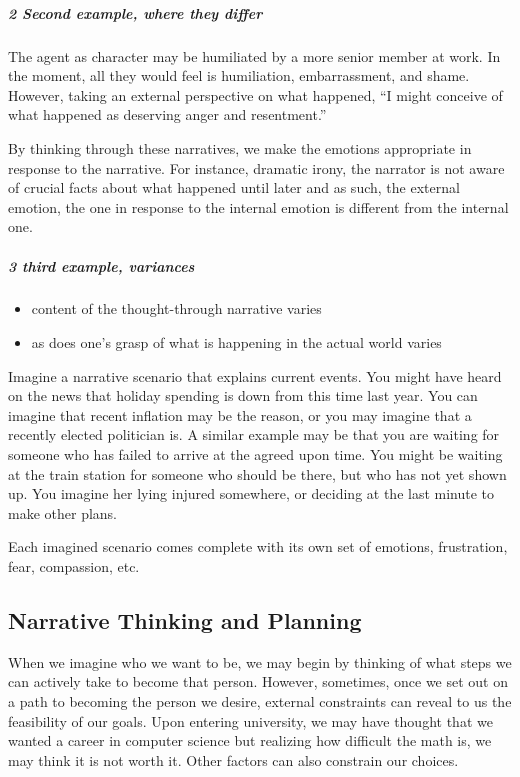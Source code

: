 \documentclass[
]{article}
\begin{document}
\hypertarget{second-example-where-they-differ}{%
\subparagraph{2 Second example, where they
differ}\label{second-example-where-they-differ}}

The agent as character may be humiliated by a more senior member at
work. In the moment, all they would feel is humiliation, embarrassment,
and shame. However, taking an external perspective on what happened, ``I
might conceive of what happened as deserving anger and resentment.''

By thinking through these narratives, we make the emotions appropriate
in response to the narrative. For instance, dramatic irony, the narrator
is not aware of crucial facts about what happened until later and as
such, the external emotion, the one in response to the internal emotion
is different from the internal one.

\hypertarget{third-example-variances}{%
\subparagraph{3 third example,
variances}\label{third-example-variances}}

\begin{itemize}
\item
  content of the thought-through narrative varies
\item
  as does one's grasp of what is happening in the actual world varies
\end{itemize}

Imagine a narrative scenario that explains current events. You might
have heard on the news that holiday spending is down from this time last
year. You can imagine that recent inflation may be the reason, or you
may imagine that a recently elected politician is. A similar example may
be that you are waiting for someone who has failed to arrive at the
agreed upon time. You might be waiting at the train station for someone
who should be there, but who has not yet shown up. You imagine her lying
injured somewhere, or deciding at the last minute to make other plans.

Each imagined scenario comes complete with its own set of emotions,
frustration, fear, compassion, etc.

\hypertarget{narrative-thinking-and-planning}{%
\subsection{Narrative Thinking and
Planning}\label{narrative-thinking-and-planning}}

When we imagine who we want to be, we may begin by thinking of what
steps we can actively take to become that person. However, sometimes,
once we set out on a path to becoming the person we desire, external
constraints can reveal to us the feasibility of our goals. Upon entering
university, we may have thought that we wanted a career in computer
science but realizing how difficult the math is, we may think it is not
worth it. Other factors can also constrain our choices.
\end{document}
